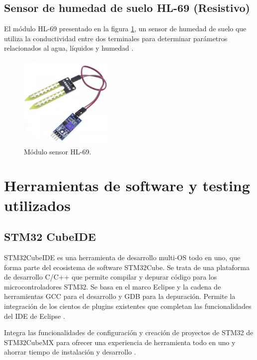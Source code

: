 \subsection{Sensor de humedad de suelo HL-69 (Resistivo)}
El módulo HL-69 presentado en la figura \ref{fig:SensorHL-69}, un sensor de humedad de suelo que utiliza la conductividad entre dos terminales para determinar parámetros relacionados al agua, líquidos y humedad \citep{ModuloHL-69}.
\begin{figure}[htbp]
	\centering
	\includegraphics[width=4.5cm, height=4.5cm]{./Figures/sensordehumedad.png}
	\caption{Módulo sensor HL-69\protect\footnotemark.}
	\label{fig:SensorHL-69}
\end{figure}

\section{Herramientas de software y testing utilizados}
\subsection{STM32 CubeIDE}
STM32CubeIDE es una herramienta de desarrollo multi-OS todo en uno, que forma parte del ecosistema de software STM32Cube. Se trata de una plataforma de desarrollo C/C++ que permite compilar y depurar código para los microcontroladores STM32. Se basa en el marco Eclipse  y la cadena de herramientas GCC para el desarrollo y GDB para la depuración. Permite la integración de los cientos de plugins existentes que completan las funcionalidades del IDE de Eclipse \citep{STM32CUBEIDE}.

Integra las funcionalidades de configuración y creación de proyectos de STM32 de STM32CubeMX para ofrecer una experiencia de herramienta todo en uno y ahorrar tiempo de instalación y desarrollo \citep{STM32CUBEIDE}.

